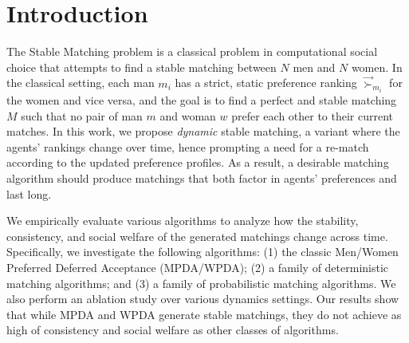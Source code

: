 \section{Introduction}
 
The Stable Matching problem is a classical problem in computational social choice that attempts to find a stable matching between $N$ men and $N$ women. In the classical setting, each man $m_i$ has a strict, static preference ranking $\overrightarrow{\succ}_{m_i}$ for the women and vice versa, and the goal is to find a perfect and stable matching $M$ such that no pair of man $m$ and woman $w$ prefer each other to their current matches. In this work, we propose \textit{dynamic} stable matching, a variant where the agents' rankings change over time, hence prompting a need for a re-match according to the updated preference profiles. As a result, a desirable matching algorithm should produce matchings that both factor in agents' preferences and last long.


We empirically evaluate various algorithms to analyze how the stability, consistency, and social welfare of the generated matchings change across time. Specifically, we investigate the following algorithms: (1) the classic Men/Women Preferred Deferred Acceptance (MPDA/WPDA); (2) a family of deterministic matching algorithms; and (3) a family of probabilistic matching algorithms. We also perform an ablation study over various dynamics settings. Our results show that while MPDA and WPDA generate stable matchings, they do not achieve as high of consistency and social welfare as other classes of algorithms.  
